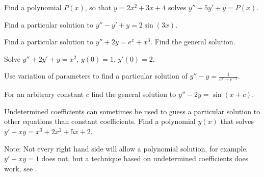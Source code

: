 \begin{exercise}
Find a polynomial $P(x)$, so that
$y = 2 x^2 + 3 x + 4$
solves
$y''+5 y'+ y = P(x)$.
\end{exercise}

\setcounter{exercise}{100}

\begin{exercise}
Find a particular solution to $y''-y'+y=2\sin(3x)$.
\end{exercise}

\begin{samepage}
\begin{exercise}
\leavevmode
\begin{tasks}
\task Find a particular solution to $y''+2y=e^x + x^3$.
\task Find the general solution.
\end{tasks}
\end{exercise}
\end{samepage}

\begin{exercise}
Solve $y''+2y'+y = x^2$, $y(0)=1$, $y'(0)=2$.
\end{exercise}

\begin{exercise}
Use variation of parameters to
find a particular solution of $y''-y = \frac{1}{e^x+e^{-x}}$.
\end{exercise}

\begin{exercise}
For an arbitrary constant $c$ find the general solution
to $y''-2y=\sin(x+c)$.
\end{exercise}

\begin{exercise}
Undetermined coefficients can sometimes be used to guess a particular solution
to other equations than constant coefficients.
Find a polynomial $y(x)$ that solves 
$y'+ x y = x^3+2x^2+5x+2$.

Note: 
Not every right hand side will allow a polynomial solution,
for example, $y'+xy=1$ does not, but a technique based on undetermined
coefficients does work, see .
\end{exercise}




